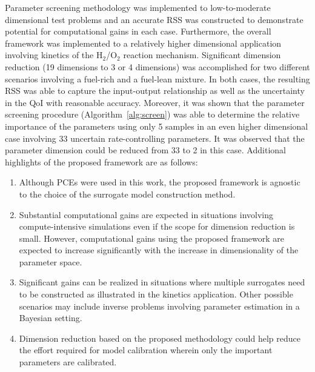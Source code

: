 Parameter screening methodology was implemented to low-to-moderate dimensional
test problems and an accurate RSS was constructed to demonstrate potential for
computational gains in each case. Furthermore, the overall framework was
implemented  to a relatively higher dimensional application involving kinetics
of the H$_2$/O$_2$ reaction mechanism.  Significant dimension reduction (19 
dimensions to 3 or 4 dimensions) was
accomplished for two different scenarios involving a fuel-rich and a fuel-lean
mixture. In both cases, the resulting RSS was able to capture the input-output
relationship as well as the uncertainty in the QoI with
reasonable accuracy. Moreover, it was shown that the parameter
screening procedure (Algorithm~\ref{alg:screen}) was able to determine the
relative importance of the
parameters using only 5 samples in an even higher dimensional
case involving 33 uncertain rate-controlling parameters. It was observed that
the parameter dimension could be reduced from 33 to 2 in this case.
Additional highlights of the proposed framework are as follows:
\begin{enumerate}
\item Although PCEs were used in this work, the proposed framework is
agnostic to the choice of the surrogate model construction method.
\item Substantial computational gains are expected in situations involving
compute-intensive simulations even if the scope for dimension reduction is
small. However, computational gains using the proposed framework
are expected to increase significantly with the increase in dimensionality of the
parameter space.

\item Significant gains can be realized in situations where multiple surrogates need to be
constructed as illustrated in the kinetics application. Other possible scenarios may
include inverse problems involving parameter estimation in a Bayesian setting.

\item Dimension reduction based on the proposed methodology could help reduce the
effort required for model calibration wherein only the important parameters
are calibrated. 
\end{enumerate}

